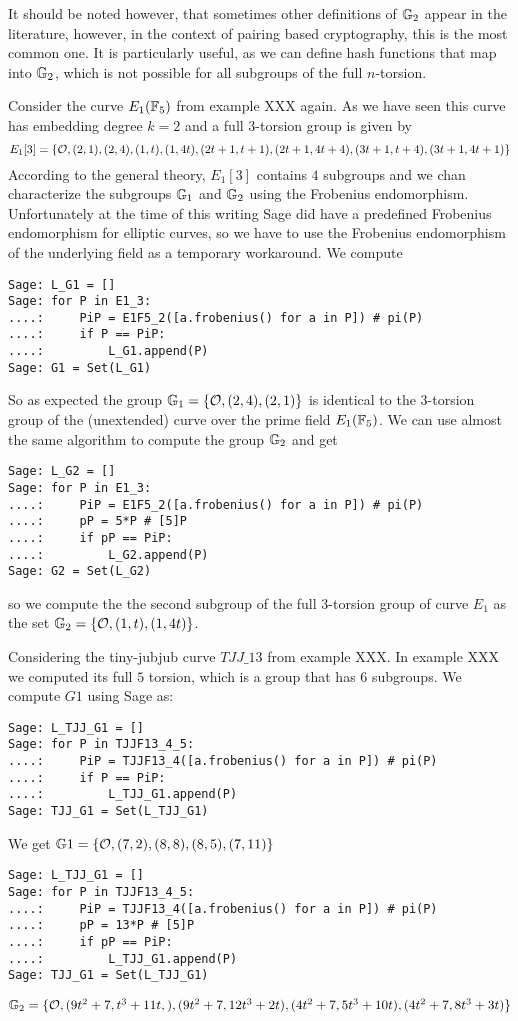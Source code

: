 It should be noted however, that sometimes other definitions of $\mathbb{G}_2$ appear in the literature, however, in the context of pairing based cryptography, this is the most common one. It is particularly useful, as we can define hash functions that map into $\mathbb{G}_2$, which is not possible for all subgroups of the full $n$-torsion.
\begin{example} Consider the curve $E_1(\mathbb{F}_5)$ from example XXX again. As we have seen this curve has embedding degree $k=2$ and a full $3$-torsion group is given by
$$
E_1[3] = \{\mathcal{O},(2,1),(2,4), (1,t), (1,4t),(2t + 1,t + 1),
 (2t + 1, 4t + 4), (3t + 1,t + 4), (3t + 1, 4t + 1) \}
$$
According to the general theory, $E_1[3]$ contains $4$ subgroups and we chan characterize the subgroups $\mathbb{G}_1$ and $\mathbb{G}_2$ using the Frobenius endomorphism. Unfortunately at the time of this writing Sage did have a predefined Frobenius endomorphism for elliptic curves, so we have to use the Frobenius endomorphism of the underlying field as a temporary workaround. We compute 
\begin{verbatim}
Sage: L_G1 = []
Sage: for P in E1_3: 
....:     PiP = E1F5_2([a.frobenius() for a in P]) # pi(P)
....:     if P == PiP:
....:         L_G1.append(P)
Sage: G1 = Set(L_G1)
\end{verbatim}
So as expected the group $\mathbb{G}_1=\{\mathcal{O}, (2,4), (2,1)\}$ is identical to the $3$-torsion group of the (unextended) curve over the prime field $E_1(\mathbb{F}_5)$. We can use almost the same algorithm to compute the group $\mathbb{G}_2$ and get 
\begin{verbatim}
Sage: L_G2 = []
Sage: for P in E1_3: 
....:     PiP = E1F5_2([a.frobenius() for a in P]) # pi(P)
....:     pP = 5*P # [5]P
....:     if pP == PiP:
....:         L_G2.append(P)
Sage: G2 = Set(L_G2)
\end{verbatim}
so we compute the the second subgroup of the full $3$-torsion group of curve $E_1$ as the set $\mathbb{G}_2 = \{\mathcal{O}, (1,t), (1,4t)\}$. 
\end{example}
\begin{example}
Considering the tiny-jubjub curve $\mathit{TJJ\_13}$ from example XXX. In example XXX we computed its full $5$ torsion, which is a group that has $6$ subgroups. We compute $G1$ using Sage as:
\begin{verbatim}
Sage: L_TJJ_G1 = []
Sage: for P in TJJF13_4_5: 
....:     PiP = TJJF13_4([a.frobenius() for a in P]) # pi(P)
....:     if P == PiP:
....:         L_TJJ_G1.append(P)
Sage: TJJ_G1 = Set(L_TJJ_G1)
\end{verbatim}
We get $\mathbb{G}1= \{\mathcal{O}, (7,2), (8,8), (8,5), (7,11)\}$
\begin{verbatim}
Sage: L_TJJ_G1 = []
Sage: for P in TJJF13_4_5: 
....:     PiP = TJJF13_4([a.frobenius() for a in P]) # pi(P)
....:     pP = 13*P # [5]P
....:     if pP == PiP:
....:         L_TJJ_G1.append(P)
Sage: TJJ_G1 = Set(L_TJJ_G1)
\end{verbatim}
$\mathbb{G}_2 = \{\mathcal{O}, (9t^2 + 7,t^3 + 11t,), (9t^2 + 7, 12t^3 + 2t), (4t^2 + 7,5t^3 + 10t),(4t^2 + 7,8t^3 + 3t)\}$
\end{example}
